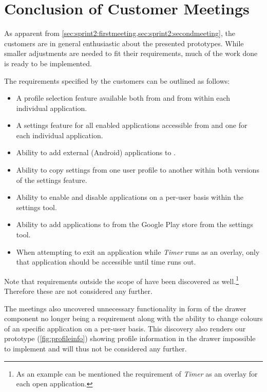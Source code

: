\section{Conclusion of Customer Meetings}\label{sec:sprint2:conclusionmeetings}

As apparent from \cref{sec:sprint2:firstmeeting,sec:sprint2:secondmeeting}, the customers are in general enthusiastic about the presented prototypes.
While smaller adjustments are needed to fit their requirements, much of the work done is ready to be implemented.

The requirements specified by the customers can be outlined as follows:

\begin{itemize}
\item A profile selection feature available both from \launcher and from within each individual application.
\item A settings feature for all enabled applications accessible from \launcher and one for each individual application.
\item Ability to add external (Android) applications to \launcher.
\item Ability to copy settings from one user profile to another within both versions of the settings feature.
\item Ability to enable and disable applications on a per-user basis within the \launcher settings tool.
\item Ability to add applications to \launcher from the Google Play store from the \launcher settings tool.
\item When attempting to exit an application while \textit{Timer} runs as an overlay, only that application should be accessible until time runs out.
\end{itemize}

Note that requirements outside the scope of \launcher have been discovered as well.\footnote{As an example can be mentioned the requirement of \textit{Timer} as an overlay for each open application.}
Therefore these are not considered any further.

The meetings also uncovered unnecessary functionality in form of the drawer component no longer being a requirement along with the ability to change colours of an specific application on a per-user basis.
This discovery also renders our prototype (\cref{fig:profileinfo}) showing profile information in the drawer impossible to implement and will thus not be considered any further.


